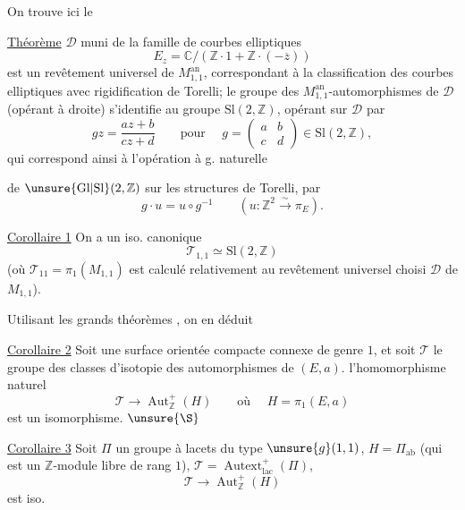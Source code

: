 On trouve ici le

\uline{Théorème} $\mathcal D$  muni de la famille  de courbes elliptiques
\[
E_z=\mathbb C/(\mathbb Z\cdot1+\mathbb Z\cdot(-\overline z))
\]
est un revêtement universel de $M_{1,1}^{\mathrm{an}}$, correspondant à la classification des courbes elliptiques avec rigidification de Torelli; le groupe des $M_{1,1}^{\mathrm{an}}$-automorphismes de $\mathcal D$ (opérant à droite) s'identifie au groupe $\mathrm{Sl}(2,\mathbb Z)$, opérant sur $\mathcal D$ par
\[
gz=\frac{az+b}{cz+d}\qquad\text{pour }\quad
g=\begin{pmatrix}a&b\\c&d\end{pmatrix}\in\mathrm{Sl}(2,\mathbb Z),
\]
qui correspond ainsi à l'opération à g. naturelle

de $\unsure{\mathrm{Gl}|\mathrm{Sl}}(2,\mathbb Z)$ sur les structures de Torelli, par
\[
g\cdot u=u\circ g^{-1}\qquad
(u:\mathbb Z^2\xrightarrow{\sim}\pi_E).
\]

\uline{Corollaire 1} On a un iso. canonique
\begin{equation}
\mathcal T_{1,1}\simeq\mathrm{Sl}(2,\mathbb Z)
\tag{26}
\end{equation}
(où $\mathcal T_{11}=\pi_1(M_{1,1})$ est calculé relativement au revêtement universel choisi $\mathcal D$ de $M_{1,1}$).

Utilisant les grands théorèmes , on en déduit

\uline{Corollaire 2} Soit  une surface orientée  compacte connexe de genre $1$, et soit $\mathcal T$ le groupe des classes d'isotopie des automorphismes de $(E,a)$.  l'homomorphisme naturel
\begin{equation}
\mathcal T\longrightarrow\operatorname{Aut}_{\mathbb Z}^{+}(H)
\qquad\text{où }\quad H=\pi_1(E,a)
\tag{27}
\end{equation}
est un isomorphisme. $\unsure{\S}$

\uline{Corollaire 3} Soit $\Pi$ un groupe à lacets du type $\unsure{g}(1,1)$, $H=\Pi_{\mathrm{ab}}$ (qui est un $\mathbb Z$-module libre de rang $1$), $\mathcal T=\operatorname{Autext}^{+}_{\mathrm{lac}}(\Pi)$, 
\begin{equation}
\mathcal T\longrightarrow\operatorname{Aut}_{\mathbb Z}^{+}(H)
\tag{28}
\end{equation}
est iso.

